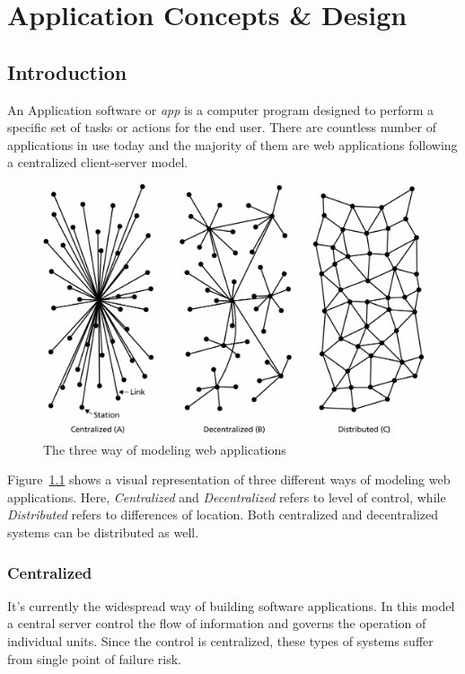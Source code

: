 \chapter{Application Concepts \& Design}\label{chapter::app-concepts-design}

\section{Introduction}
	An Application software or \textit{app} is a computer program designed to perform a specific set of tasks or actions for the end user. There are countless number of applications in use today and the majority of them are web applications following a centralized client-server model\cite{raval2016decentralized}.
	
	\begin{figure}[h]
		\includegraphics[width=\linewidth]{figures/network-models}
		\caption{\label{fig:applications} The three way of modeling web applications}
	\end{figure}
	
	Figure~\ref{fig:applications} shows a visual representation of three different ways of modeling web applications\cite{baran1964distributed}. Here, \textit{Centralized} and \textit{Decentralized} refers to level of control, while \textit{Distributed} refers to differences of location. Both centralized and decentralized systems can be distributed as well.
	
	\subsection{Centralized}
	It's currently the widespread way of building software applications. In this model a central server control the flow of information and governs the operation of individual units. Since the control is centralized, these types of systems suffer from single point of failure risk.
	
